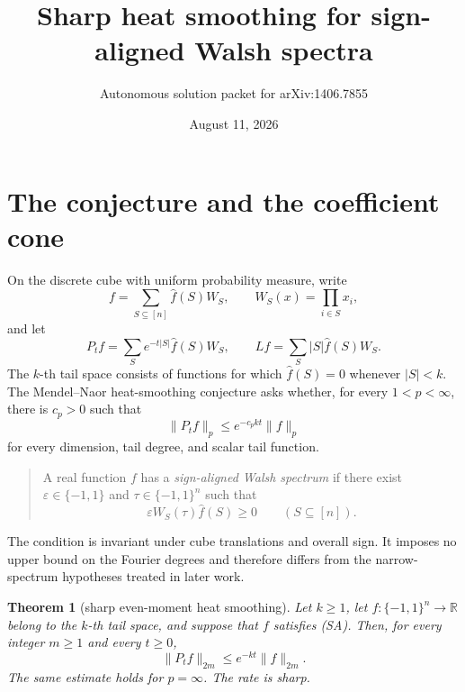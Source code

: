 \documentclass[11pt]{article}
\title{Sharp heat smoothing for sign-aligned Walsh spectra}
\author{Autonomous solution packet for arXiv:1406.7855}
\date{August 11, 2026}
\newtheorem{theorem}{Theorem}
\newcommand{\cube}{\{-1,1\}^n}
\newcommand{\wh}{\widehat}
\begin{document}
\maketitle

\begin{center}
\end{center}

\section{The conjecture and the coefficient cone}

On the discrete cube with uniform probability measure, write
\[
 f=\sum_{S\subseteq[n]}\wh f(S)W_S,\qquad
 W_S(x)=\prod_{i\in S}x_i,
\]
and let
\[
 P_tf=\sum_Se^{-t|S|}\wh f(S)W_S,\qquad
 Lf=\sum_S|S|\wh f(S)W_S.
\]
The $k$-th tail space consists of functions for which
$\wh f(S)=0$ whenever $|S|<k$.  The Mendel--Naor heat-smoothing
conjecture asks whether, for every $1<p<\infty$, there is $c_p>0$ such
that
\[
 \|P_tf\|_p\le e^{-c_pkt}\|f\|_p                              \tag{HS}
\]
for every dimension, tail degree, and scalar tail function.

\begin{quote}
A real function $f$ has a \emph{sign-aligned Walsh spectrum} if there
exist $\varepsilon\in\{-1,1\}$ and
$\tau\in\{-1,1\}^n$ such that
\[
 \varepsilon W_S(\tau)\wh f(S)\ge0\qquad(S\subseteq[n]).
                                                                    \tag{SA}
\]
\end{quote}
The condition is invariant under cube translations and overall sign.
It imposes no upper bound on the Fourier degrees and therefore differs
from the narrow-spectrum hypotheses treated in later work.

\begin{theorem}[sharp even-moment heat smoothing]\label{thm:main}
Let $k\ge1$, let $f:\cube\to\mathbb R$ belong to the $k$-th tail space,
and suppose that $f$ satisfies\/ {\rm(SA)}.  Then, for every integer
$m\ge1$ and every $t\ge0$,
\[
 \|P_tf\|_{2m}\le e^{-kt}\|f\|_{2m}.                            \tag{1}
\]
The same estimate holds for $p=\infty$.  The rate is sharp.
\end{theorem}
\end{document}

